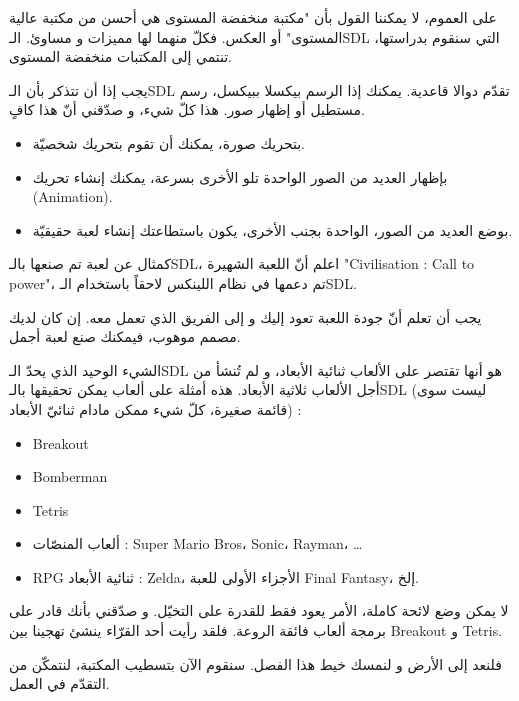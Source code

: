 على العموم، لا يمكننا القول بأن "مكتبة منخفضة المستوى هي أحسن من مكتبة عالية المستوى" أو العكس. فكلّ منهما لها مميزات و مساوئ. الـ\textenglish{SDL}
التي سنقوم بدراستها، تنتمي إلى المكتبات منخفضة المستوى.

يجب إذا أن تتذكر بأن الـ\textenglish{SDL}
تقدّم دوالا قاعدية. يمكنك إذا الرسم بيكسلا ببيكسل، رسم مستطيل أو إظهار صور. هذا كلّ شيء، و صدّقني أنّ هذا كافٍ.

\begin{itemize}
	\item بتحريك صورة، يمكنك أن تقوم بتحريك شخصيّة.
	\item بإظهار العديد من الصور الواحدة تلو الأخرى بسرعة، يمكنك إنشاء تحريك
	(\textenglish{Animation}).
	\item بوضع العديد من الصور، الواحدة بجنب الأخرى، يكون باستطاعتك إنشاء لعبة حقيقيّة.
\end{itemize}

كمثال عن لعبة تم صنعها بالـ\textenglish{SDL}،
اعلم أنّ اللعبة الشهيرة
"\textenglish{Civilisation : Call to power}"،
تم دعمها في نظام اللينكس لاحقاً باستخدام الـ\textenglish{SDL}.


يجب أن تعلم أنّ جودة اللعبة تعود إليك و إلى الفريق الذي تعمل معه. إن كان لديك مصمم موهوب، فيمكنك صنع لعبة أجمل.

الشيء الوحيد الذي يحدّ الـ\textenglish{SDL}
هو أنها تقتصر على الألعاب ثنائية الأبعاد، و لم تُنشأ من أجل الألعاب ثلاثية الأبعاد. هذه أمثلة على ألعاب يمكن تحقيقها بالـ\textenglish{SDL}
(ليست سوى قائمة صغيرة، كلّ شيء ممكن مادام ثنائيّ الأبعاد) :

\begin{itemize}
	\item \textenglish{Breakout}
	\item \textenglish{Bomberman}
	\item \textenglish{Tetris}
	\item ألعاب المنصّات :
	\textenglish{Super Mario Bros}، \textenglish{Sonic}، \textenglish{Rayman}، \dots
	\item \textenglish{RPG} ثنائية الأبعاد :
	\textenglish{Zelda}،
	الأجزاء الأولى للعبة
	\textenglish{Final Fantasy}،
	إلخ.
\end{itemize}
لا يمكن وضع لائحة كاملة، الأمر يعود فقط للقدرة على التخيّل. و صدّقني بأنك قادر على برمجة ألعاب فائقة الروعة. فلقد رأيت أحد القرّاء ينشئ تهجينا بين
\textenglish{Breakout}
و
\textenglish{Tetris}.

فلنعد إلى الأرض و لنمسك خيط هذا الفصل. سنقوم الآن بتسطيب المكتبة، لنتمكّن من التقدّم في العمل.

